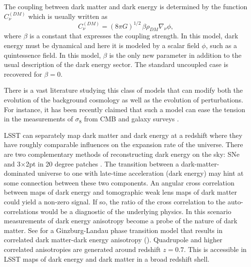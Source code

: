 The coupling between dark matter and dark energy is determined by the function $C^{(DM)}_{\nu}$ which is usually
written as
\begin{equation}
C^{(DM)}_{\nu} = (8\pi G)^{1/2} \,\beta\rho_{DM}\nabla_{\nu} \phi,
\end{equation}
where $\beta$ is a constant that expresses the coupling strength. In this model, dark energy must be dynamical and here it is modeled by a scalar field  $\phi$, such as a quintessence field.
In this model, $\beta$ is the only new parameter in addition to the usual description of the dark energy sector.
The standard uncoupled case is recovered for $\beta=0$.

There is a vast literature studying this class of models that can modify both the evolution of the 
background cosmology as well as the evolution of perturbations. For instance, it has been recently claimed
that such a model can ease the tension in the measurements of $\sigma_8$ from CMB and galaxy surveys 
\citep{Barros:2018efl}.

LSST can separately map dark matter and dark energy at a redshift where they have roughly comparable influences on the expansion rate of the universe. 
There are two complementary methods of reconstructing dark energy on the sky: SNe and 3$\times$2pt in 20 degree patches \citep[Figure 15.9 in ][]{0912.0201}.
The transition between a dark-matter-dominated universe to one with late-time acceleration (dark energy) may hint at some connection between these two components. 
An angular cross correlation between maps of dark energy and tomographic weak lens maps of dark matter could yield a non-zero signal.  
If so, the ratio of the cross correlation to the auto-correlations would be a diagnostic of the underlying physics. 
In this scenario measurements of dark energy anisotropy become a probe of the nature of dark matter. 
See \cite{1810.11007} for a Ginzburg-Landau phase transition model that results in correlated dark matter-dark energy anisotropy (). 
Quadrupole and higher correlated anisotropies are generated around redshift $z=0.7$.  
This is accessible in LSST maps of dark energy and dark matter in a broad redshift shell.

